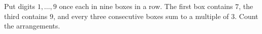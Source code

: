Put digits $1,\ldots,9$ once each in nine boxes in a row. The first box contains $7$, the third contains $9$, and every three consecutive boxes sum to a multiple of $3$. Count the arrangements.
